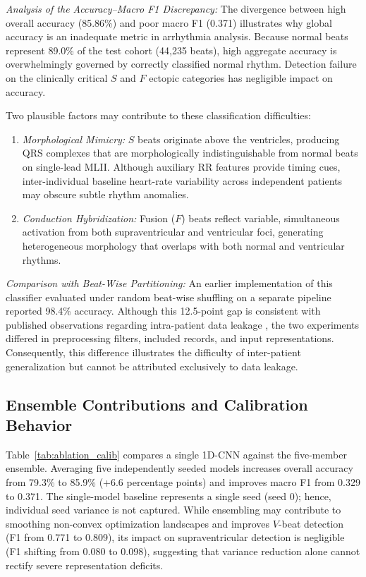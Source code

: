 \documentclass[conference]{IEEEtran}
\begin{document}
\textit{Analysis of the Accuracy--Macro F1 Discrepancy:} The divergence between high overall accuracy (85.86\%) and poor macro F1 (0.371) illustrates why global accuracy is an inadequate metric in arrhythmia analysis. Because normal beats represent 89.0\% of the test cohort (44,235 beats), high aggregate accuracy is overwhelmingly governed by correctly classified normal rhythm. Detection failure on the clinically critical $S$ and $F$ ectopic categories has negligible impact on accuracy. 

Two plausible factors may contribute to these classification difficulties:
\begin{enumerate}
    \item \emph{Morphological Mimicry:} $S$ beats originate above the ventricles, producing QRS complexes that are morphologically indistinguishable from normal beats on single-lead MLII. Although auxiliary RR features provide timing cues, inter-individual baseline heart-rate variability across independent patients may obscure subtle rhythm anomalies.
    \item \emph{Conduction Hybridization:} Fusion ($F$) beats reflect variable, simultaneous activation from both supraventricular and ventricular foci, generating heterogeneous morphology that overlaps with both normal and ventricular rhythms.
\end{enumerate}

\textit{Comparison with Beat-Wise Partitioning:} An earlier implementation of this classifier evaluated under random beat-wise shuffling on a separate pipeline reported 98.4\% accuracy. Although this 12.5-point gap is consistent with published observations regarding intra-patient data leakage \cite{b3,b12,b13}, the two experiments differed in preprocessing filters, included records, and input representations. Consequently, this difference illustrates the difficulty of inter-patient generalization but cannot be attributed exclusively to data leakage.

\subsection{Ensemble Contributions and Calibration Behavior}
Table~\ref{tab:ablation_calib} compares a single 1D-CNN against the five-member ensemble. Averaging five independently seeded models increases overall accuracy from 79.3\% to 85.9\% (+6.6 percentage points) and improves macro F1 from 0.329 to 0.371. The single-model baseline represents a single seed (seed 0); hence, individual seed variance is not captured. While ensembling may contribute to smoothing non-convex optimization landscapes and improves $V$-beat detection (F1 from 0.771 to 0.809), its impact on supraventricular detection is negligible (F1 shifting from 0.080 to 0.098), suggesting that variance reduction alone cannot rectify severe representation deficits.
\end{document}
